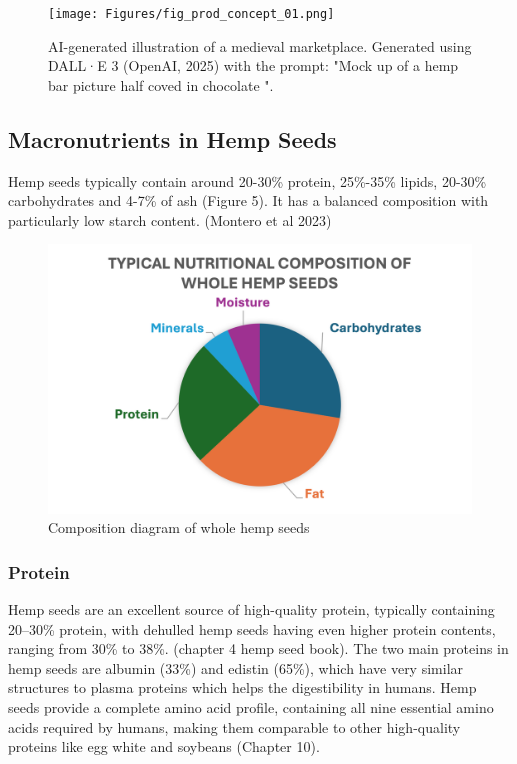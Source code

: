 \begin{figure}[H]
    \centering
    \texttt{[image: Figures/fig\_prod\_concept\_01.png]}
    \caption{AI-generated illustration of a medieval marketplace. Generated using DALL·E 3 (OpenAI, 2025) with the prompt: "Mock up of a hemp bar picture half coved in chocolate ".}
    \label{fig:prod_concept_01}
\end{figure}


\subsection{Macronutrients in Hemp Seeds}
Hemp seeds typically contain around 20-30\% protein, 25\%-35\% lipids, 20-30\% carbohydrates and 4-7\% of ash (Figure 5). It has a balanced composition with particularly low starch content. (Montero et al 2023) 

\begin{figure}[H]
    \centering
    \includegraphics[width=0.75\linewidth]{Figures/fig_prod_concept_02.png}
    \caption{Composition diagram of whole hemp seeds}
    \label{fig:prod_concept_02}
\end{figure}

\subsubsection{Protein}
Hemp seeds are an excellent source of high-quality protein, typically containing 20–30\% protein, with dehulled hemp seeds having even higher protein contents, ranging from 30\% to 38\%. (chapter 4 hemp seed book). The two main proteins in hemp seeds are albumin (33\%) and edistin (65\%), which have very similar structures to plasma proteins which helps the digestibility in humans. Hemp seeds provide a complete amino acid profile, containing all nine essential amino acids required by humans, making them comparable to other high-quality proteins like egg white and soybeans (Chapter 10). 

